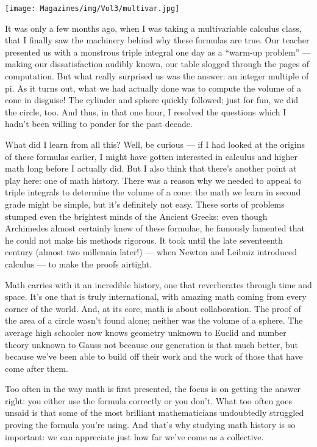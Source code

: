 \documentclass{article}
\begin{document}
\begin{center}
\texttt{[image: Magazines/img/Vol3/multivar.jpg]}
\end{center}
It was only a few months ago, when I was taking a multivariable calculus class, that I finally saw the machinery behind why these formulas are true. Our teacher presented us with a monstrous triple integral one day as a “warm-up problem” — making our dissatisfaction audibly known, our table slogged through the pages of computation. But what really surprised us was the answer: an integer multiple of pi. As it turns out, what we had actually done was to compute the volume of a cone in disguise! The cylinder and sphere quickly followed; just for fun, we did the circle, too. And thus, in that one hour, I resolved the questions which I hadn’t been willing to ponder for the past decade. 

What did I learn from all this? Well, be curious — if I had looked at the origins of these formulas earlier, I might have gotten interested in calculus and higher math long before I actually did. But I also think that there’s another point at play here: one of math history. There was a reason why we needed to appeal to triple integrals to determine the volume of a cone: the math we learn in second grade might be simple, but it’s definitely not easy. These sorts of problems stumped even the brightest minds of the Ancient Greeks; even though Archimedes almost certainly knew of these formulae, he famously lamented that he could not make his methods rigorous. It took until the late seventeenth century (almost two millennia later!) — when Newton and Leibniz introduced calculus — to make the proofs airtight. 

Math carries with it an incredible history, one that reverberates through time and space. It’s one that is truly international, with amazing math coming from every corner of the world. And, at its core, math is about collaboration. The proof of the area of a circle wasn’t found alone; neither was the volume of a sphere. The average high schooler now knows geometry unknown to Euclid and number theory unknown to Gauss not because our generation is that much better, but because we’ve been able to build off their work and the work of those that have come after them. 

Too often in the way math is first presented, the focus is on getting the answer right: you either use the formula correctly or you don’t. What too often goes unsaid is that some of the most brilliant mathematicians undoubtedly struggled proving the formula you’re using. And that’s why studying math history is so important: we can appreciate just how far we’ve come as a collective. 
\end{document}
